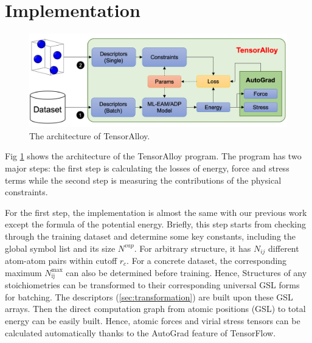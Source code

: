 \documentclass[final,3p,times]{elsarticle}
\begin{document}
% 
%
\section{Implementation}
\label{sec:implementation}

% 
%
\begin{figure}
\centering
\includegraphics[scale=0.6]{tensoralloy.png}
\caption{\label{fig:tensoralloy} The architecture of TensorAlloy.}
\end{figure}

Fig \ref{fig:tensoralloy} shows the architecture of the TensorAlloy program. The 
program has two major steps: the first step is calculating the losses of energy,
force and stress terms while the second step is measuring the contributions of 
the physical constraints. 

For the first step, the implementation is almost the same with our previous 
work \cite{TensorAlloy} except the formula of the potential energy. Briefly, 
this step starts from checking through the training dataset and determine some
key constants, including the global symbol list and its size $N^{vap}$. For 
arbitrary structure, it has $N_{ij}$ different atom-atom pairs within cutoff 
$r_c$. For a concrete dataset, the corresponding maximum 
$N^{\mathrm{max}}_{\mathrm{ij}}$ can also be determined before training. Hence,
Structures of any stoichiometries can be transformed to their corresponding 
universal GSL forms for batching. The descriptors (\ref{sec:transformation}) are 
built upon these GSL arrays. Then the direct computation graph from atomic 
positions (GSL) to total energy can be easily built. Hence, atomic forces and 
virial stress tensors can be calculated automatically thanks to the AutoGrad 
feature of TensorFlow.
\end{document}
